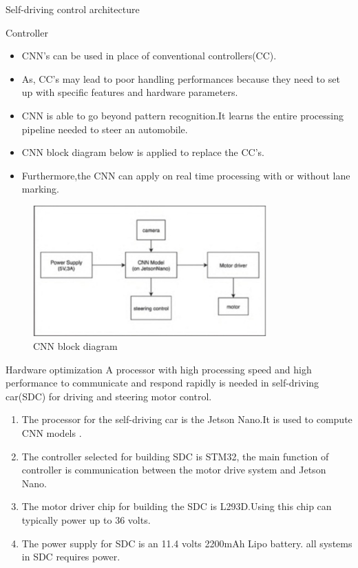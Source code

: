 \documentclass{beamer}
\begin{document}
\begin{frame}{Self-driving control architecture}
\begin{block}{Controller}
 \begin{itemize}
     
\item CNN's can be used in place of conventional controllers(CC). 
\item As, CC's may lead to poor handling performances because they need to set up with specific features and hardware parameters.
\item CNN is able to go beyond pattern recognition.It learns the entire processing pipeline needed to steer an automobile.
\item CNN block diagram below is applied to replace the CC's.
\item Furthermore,the CNN can apply on real time processing with or without lane marking.
    \end{itemize}
\end{block}
\end{frame} 
 
 
\begin{frame}    
\begin{figure}[ht]
    \centering
    \includegraphics[width=0.8\textwidth]{CNN block diagram.jpg}
    \caption{CNN block diagram}
\end{figure}
\end{frame}

\begin{frame}
 \begin{block}{Hardware optimization}
 A processor with high processing speed and high performance to communicate and respond rapidly is needed in self-driving car(SDC) for driving and steering motor control.
 \begin{enumerate}
     \item The processor for the self-driving car is the Jetson Nano.It is used to compute CNN models .
     \item The controller selected for building SDC is STM32, the main function of controller is communication between the motor drive system and Jetson Nano.
     \item The motor driver chip for building the SDC is L293D.Using this chip can typically power up to 36 volts.
     \item The power supply for SDC is an 11.4 volts 2200mAh Lipo battery.
     all systems in SDC requires power.
 \end{enumerate}
 \end{block}   
\end{frame}
\end{document}
